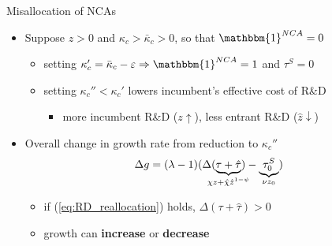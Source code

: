 \documentclass[english,usenames,dvipsnames]{beamer}
\begin{document}
\begin{frame}{Misallocation of NCAs}\label{misallocation_of_nca} 
	\hyperlink{efficiency}{}
	\begin{itemize}
		\item <+-> Suppose $z > 0$ and $\kappa_c > \bar{\kappa}_c > 0$, so that $\mathbbm{1}^{NCA} = 0$ 
		\begin{itemize}
			\item setting $\kappa_c' = \bar{\kappa}_c - \varepsilon \Rightarrow \mathbbm{1}^{NCA} = 1$ and $\tau^S = 0$
			\item setting $\kappa_c'' < \kappa_c'$ lowers incumbent's effective cost of R\&D
			\begin{itemize}
				\item more incumbent R\&D ($z \uparrow$), less entrant R\&D ($\hat{z} \downarrow$)
			\end{itemize}
		\end{itemize}
		\item <+-> Overall change in growth rate from reduction to $\kappa_c''$
		\begin{align*}
			\Delta g  &= (\lambda -1) (\Delta (\underbrace{\tau + \hat{\tau}}_{\mathclap{\chi z + \hat{\chi} \hat{z}^{1-\psi}}}) - \underbrace{\tau^S_0}_{\mathclap{ \nu z_0}})
		\end{align*}
		\begin{itemize}
			\item if (\ref{eq:RD_reallocation}) holds, $\Delta(\tau+ \hat{\tau}) > 0$ 
			\item growth can \alert{\textbf{increase}} or \alert{\textbf{decrease}}  
		\end{itemize}
	\end{itemize}
\end{frame}
\end{document}
